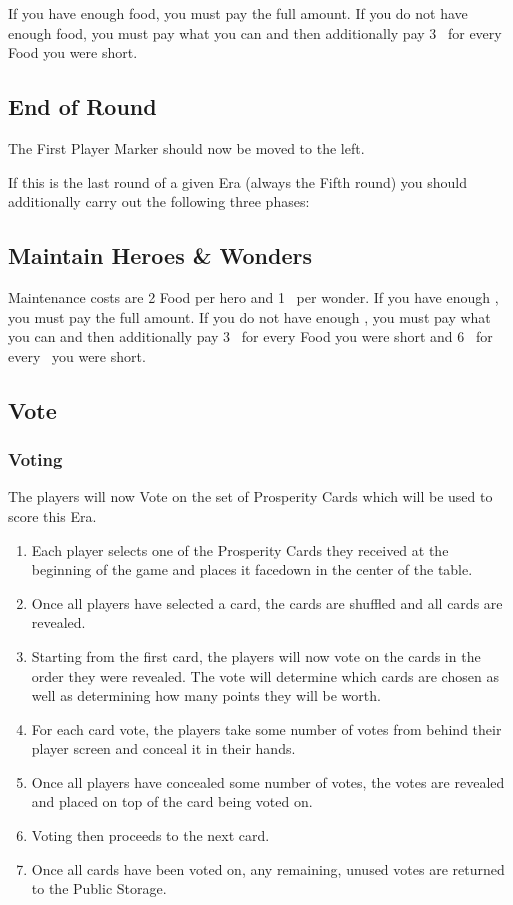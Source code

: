 \documentclass[10pt,twocolumn]{article}
\begin{document}
If you have enough food, you must pay the full amount. If you do not have enough food, you must pay what you can and then additionally pay 3 \vps\ for every Food you were short.

\subsection{End of Round}
The First Player Marker should now be moved to the left.

If this is the last round of a given Era (always the Fifth round) you should additionally carry out the following three phases:

\subsection{Maintain Heroes \& Wonders}
Maintenance costs are 2 Food per hero and 1 \mineral\ per wonder. If you have enough \goods, you must pay the full amount. If you do not have enough \goods, you must pay what you can and then additionally pay 3 \vps\ for every Food you were short and 6 \vps\ for every \mineral\ you were short.
\subsection{Vote}
\subsubsection{Voting}
The players will now Vote on the set of Prosperity Cards which will be used to score this Era.
\begin{enumerate}
\item Each player selects one of the Prosperity Cards they received at the beginning of the game and places it facedown in the center of the table.
\item Once all players have selected a card, the cards are shuffled and all cards are revealed.
\item Starting from the first card, the players will now vote on the cards in the order they were revealed. The vote will determine which cards are chosen as well as determining how many points they will be worth.
\item For each card vote, the players take some number of votes from behind their player screen and conceal it in their hands. 
\item Once all players have concealed some number of votes, the votes are revealed and placed on top of the card being voted on.
\item Voting then proceeds to the next card.
\item Once all cards have been voted on, any remaining, unused votes are returned to the Public Storage.
\end{enumerate}
\end{document}
